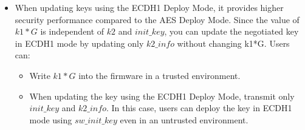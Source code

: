 \documentclass[main\_\_EN.tex]{subfiles}
\begin{document}
\begin{itemize}
    \begin{itemize}
        \item If using \begin{math}init\_key\end{math} stored in a eFuse block with purpose of EFUSE\_KM\_INIT\_KEY, \begin{math}k2\_info\end{math} and \begin{math}k1*G\end{math} may be transmitted in an untrusted environment. However, this requires to locally retain the \begin{math}init\_key\end{math} that was written to the EFUSE\_KM\_INIT\_KEY eFuse block at the first time.
        \item If using \begin{math}sw\_init\_key\end{math}, the transmission of \begin{math}sw\_init\_key\end{math}, \begin{math}k2\_info\end{math}, and \begin{math}k1*G\end{math} must occur in a trusted environment.
    \end{itemize}
    \item When updating keys using the ECDH1 Deploy Mode, it provides higher security performance compared to the AES Deploy Mode. Since the value of \begin{math}k1*G\end{math} is independent of \begin{math}k2\end{math} and \begin{math}init\_key\end{math}, you can update the negotiated key in ECDH1 mode by updating only \begin{math}k2\_info\end{math} without changing k1*G. Users can:
    \begin{itemize}
        \item Write \begin{math}k1*G\end{math} into the firmware in a trusted environment.
        \item When updating the key using the ECDH1 Deploy Mode, transmit only \begin{math}init\_key\end{math} and \begin{math}k2\_info\end{math}. In this case, users can deploy the key in ECDH1 mode using \begin{math}sw\_init\_key\end{math} even in an untrusted environment.
    \end{itemize}
\end{itemize}
\end{document}
